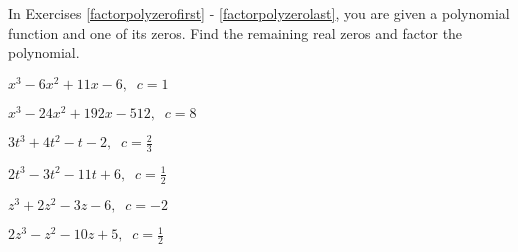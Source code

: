 In Exercises \ref{factorpolyzerofirst} - \ref{factorpolyzerolast}, you are given a polynomial function and one of its zeros.  Find the remaining real zeros and factor the polynomial.  

\begin{shortexenum}
\item $x^{3} - 6x^{2} + 11x - 6, \;\; c = 1$ \label{factorpolyzerofirst}
\item $x^{3} - 24x^{2} + 192x - 512, \;\; c = 8$
\item $3t^{3} + 4t^{2} - t - 2, \;\; c = \frac{2}{3}$
\item $2t^3-3t^2-11t+6, \;\; c=\frac{1}{2}$
\item $z^3+2z^2-3z-6, \;\; c = -2$
\item $2z^3-z^2-10z+5, \;\; c=\frac{1}{2}$
\end{shortexenum}


